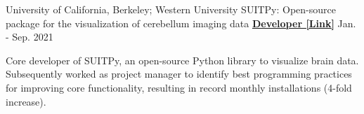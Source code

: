 \begin{cventries}
    
  \cventry
    {University of California, Berkeley; Western University} %
  	{SUITPy: Open-source package for the visualization of cerebellum imaging data} %
  	{\href{https://suitpy.readthedocs.io/en/latest/}{\textbf{Developer [Link]}}}
  	{Jan. - Sep. 2021}
    {
      \begin{cvitems} %
      	\item {Core developer of SUITPy, an open-source Python library to visualize brain data. Subsequently worked as project manager to identify best programming practices for improving core functionality, resulting in record monthly installations (4-fold increase).}
      \end{cvitems}
    }
    
    
    

\end{cventries}
